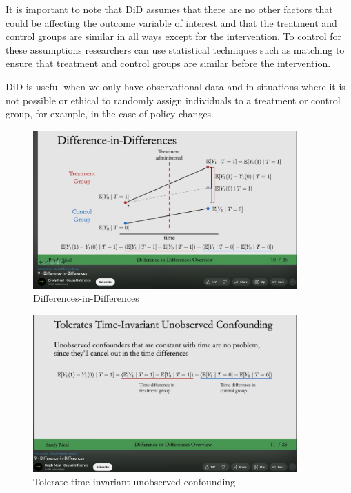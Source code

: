 \documentclass[
  12pt,
  oneside]{book}
\theoremstyle{definition}
\theoremstyle{definition}
\theoremstyle{definition}
\theoremstyle{definition}
\theoremstyle{remark}
\begin{document}
It is important to note that DiD assumes that there are no other factors that could be affecting the outcome variable of interest and that the treatment and control groups are similar in all ways except for the intervention. To control for these assumptions researchers can use statistical techniques such as matching to ensure that treatment and control groups are similar before the intervention.

DiD is useful when we only have observational data and in situations where it is not possible or ethical to randomly assign individuals to a treatment or control group, for example, in the case of policy changes.

\begin{figure}
\centering
\includegraphics[width=0.9\textwidth,height=\textheight]{fig/neal9.png}
\caption{\label{fig:neal9} Differences-in-Differences}
\end{figure}

\begin{figure}
\centering
\includegraphics[width=0.9\textwidth,height=\textheight]{fig/neal9b.png}
\caption{\label{fig:neal9b} Tolerate time-invariant unobserved confounding}
\end{figure}
\end{document}
